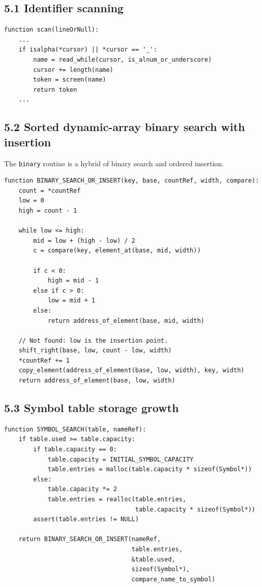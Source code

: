 \documentclass[11pt]{article}
\begin{document}
\subsection{5.1 Identifier scanning}\label{identifier-scanning}

\begin{verbatim}
function scan(lineOrNull):
    ...
    if isalpha(*cursor) || *cursor == '_':
        name = read_while(cursor, is_alnum_or_underscore)
        cursor += length(name)
        token = screen(name)
        return token
    ...
\end{verbatim}

\subsection{5.2 Sorted dynamic-array binary search with
insertion}\label{sorted-dynamic-array-binary-search-with-insertion}

The \texttt{binary} routine is a hybrid of binary
search and ordered insertion.

\begin{verbatim}
function BINARY_SEARCH_OR_INSERT(key, base, countRef, width, compare):
    count = *countRef
    low = 0
    high = count - 1

    while low <= high:
        mid = low + (high - low) / 2
        c = compare(key, element_at(base, mid, width))

        if c < 0:
            high = mid - 1
        else if c > 0:
            low = mid + 1
        else:
            return address_of_element(base, mid, width)

    // Not found: low is the insertion point.
    shift_right(base, low, count - low, width)
    *countRef += 1
    copy_element(address_of_element(base, low, width), key, width)
    return address_of_element(base, low, width)
\end{verbatim}

\subsection{5.3 Symbol table storage
growth}\label{symbol-table-storage-growth}

\begin{verbatim}
function SYMBOL_SEARCH(table, nameRef):
    if table.used >= table.capacity:
        if table.capacity == 0:
            table.capacity = INITIAL_SYMBOL_CAPACITY
            table.entries = malloc(table.capacity * sizeof(Symbol*))
        else:
            table.capacity *= 2
            table.entries = realloc(table.entries,
                                    table.capacity * sizeof(Symbol*))
        assert(table.entries != NULL)

    return BINARY_SEARCH_OR_INSERT(nameRef,
                                   table.entries,
                                   &table.used,
                                   sizeof(Symbol*),
                                   compare_name_to_symbol)
\end{verbatim}
\end{document}
